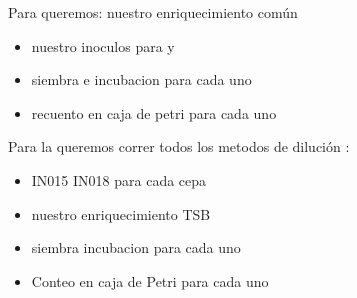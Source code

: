 \documentclass[letterpaper,10pt,spanish]{sphinxmanual}
\begin{document}
Para  queremos: \sphinxhyphen{}
nuestro enriquecimiento común
\begin{itemize}
\item {} 
nuestro inoculos para  y 

\item {} 
siembra e incubacion para cada uno

\item {} 
recuento en caja de petri para cada uno

\end{itemize}

Para la  queremos correr todos los metodos de
dilución :
\begin{itemize}
\item {} 
IN015\sphinxhyphen{} IN018 para cada cepa

\item {} 
nuestro enriquecimiento TSB

\item {} 
siembra incubacion para cada uno

\item {} 
Conteo en caja de Petri para cada uno

\end{itemize}
\end{document}
